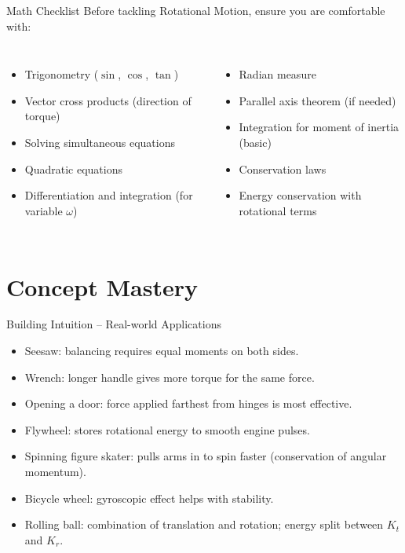 \documentclass[11pt]{beamer}
\begin{document}
\begin{frame}{Math Checklist}
Before tackling Rotational Motion, ensure you are comfortable with:
\begin{columns}[T]
\begin{itemize}
    \item Trigonometry ($\sin$, $\cos$, $\tan$)
    \item Vector cross products (direction of torque)
    \item Solving simultaneous equations
    \item Quadratic equations
    \item Differentiation and integration (for variable $\omega$)
\end{itemize}
\begin{itemize}
    \item Radian measure
    \item Parallel axis theorem (if needed)
    \item Integration for moment of inertia (basic)
    \item Conservation laws
    \item Energy conservation with rotational terms
\end{itemize}
\end{columns}
\end{frame}

\section{Concept Mastery}

\begin{frame}{Building Intuition – Real-world Applications}
\begin{itemize}
    \item \alert{Seesaw}: balancing requires equal moments on both sides.
    \item \alert{Wrench}: longer handle gives more torque for the same force.
    \item \alert{Opening a door}: force applied farthest from hinges is most effective.
    \item \alert{Flywheel}: stores rotational energy to smooth engine pulses.
    \item \alert{Spinning figure skater}: pulls arms in to spin faster (conservation of angular momentum).
    \item \alert{Bicycle wheel}: gyroscopic effect helps with stability.
    \item \alert{Rolling ball}: combination of translation and rotation; energy split between $K_t$ and $K_r$.
\end{itemize}
\end{frame}
\end{document}
